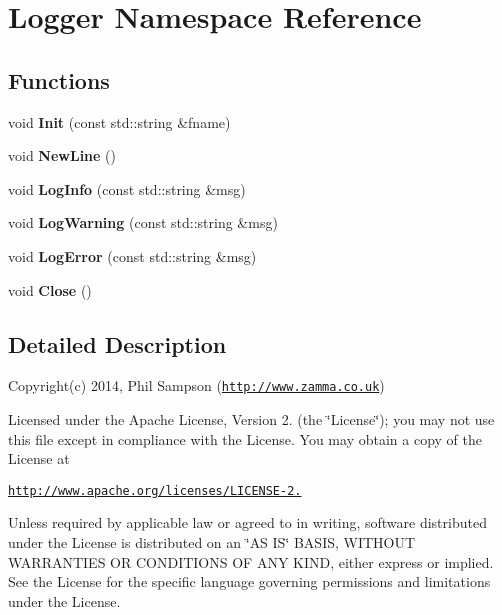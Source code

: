 \hypertarget{namespace_logger}{}\section{Logger Namespace Reference}
\label{namespace_logger}
\subsection*{Functions}
\begin{DoxyCompactItemize}
\item 
\hypertarget{namespace_logger_a0a67d9cca642837b53f12b97e8d8ed75}{}void {\bfseries Init} (const std\+::string \&fname)\label{namespace_logger_a0a67d9cca642837b53f12b97e8d8ed75}

\item 
\hypertarget{namespace_logger_ae390b2c3819cf54bf112f0a2f9a9b116}{}void {\bfseries New\+Line} ()\label{namespace_logger_ae390b2c3819cf54bf112f0a2f9a9b116}

\item 
\hypertarget{namespace_logger_aee61421bdb0c854d2f203f41c396ef59}{}void {\bfseries Log\+Info} (const std\+::string \&msg)\label{namespace_logger_aee61421bdb0c854d2f203f41c396ef59}

\item 
\hypertarget{namespace_logger_a4fd5b8d79ca7daff30a32e42cda36511}{}void {\bfseries Log\+Warning} (const std\+::string \&msg)\label{namespace_logger_a4fd5b8d79ca7daff30a32e42cda36511}

\item 
\hypertarget{namespace_logger_adf5325af43de366d89b9dcc882b9c8c6}{}void {\bfseries Log\+Error} (const std\+::string \&msg)\label{namespace_logger_adf5325af43de366d89b9dcc882b9c8c6}

\item 
\hypertarget{namespace_logger_ab13114d60ca5f1f69f2ba0f2f1a5bd19}{}void {\bfseries Close} ()\label{namespace_logger_ab13114d60ca5f1f69f2ba0f2f1a5bd19}

\end{DoxyCompactItemize}


\subsection{Detailed Description}
Copyright(c) 2014, Phil Sampson (\href{http://www.zamma.co.uk}{\tt http\+://www.\+zamma.\+co.\+uk})

Licensed under the Apache License, Version 2. (the \char`\"{}\+License\char`\"{}); you may not use this file except in compliance with the License. You may obtain a copy of the License at

\href{http://www.apache.org/licenses/LICENSE-2.0}{\tt http\+://www.\+apache.\+org/licenses/\+L\+I\+C\+E\+N\+S\+E-\/2.}

Unless required by applicable law or agreed to in writing, software distributed under the License is distributed on an \char`\"{}\+A\+S I\+S\char`\"{} B\+A\+S\+I\+S, W\+I\+T\+H\+O\+U\+T W\+A\+R\+R\+A\+N\+T\+I\+E\+S O\+R C\+O\+N\+D\+I\+T\+I\+O\+N\+S O\+F A\+N\+Y K\+I\+N\+D, either express or implied. See the License for the specific language governing permissions and limitations under the License. 